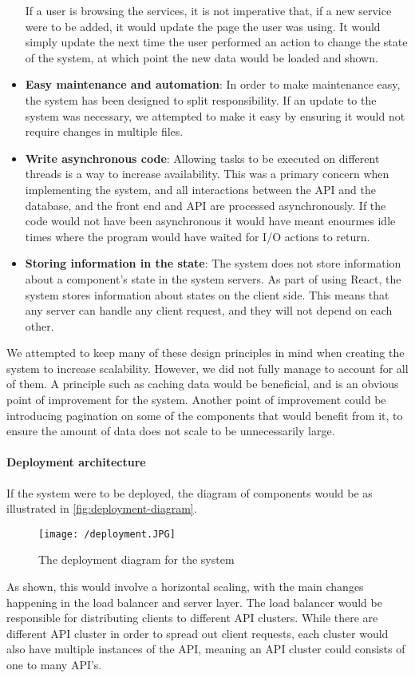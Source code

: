 \begin{itemize}
    If a user is browsing the services, it is not imperative that, if a new service were to be added, it would update the page the user was using.
    It would simply update the next time the user performed an action to change the state of the system, at which point the new data would be loaded and shown.
    \item \textbf{Easy maintenance and automation}: In order to make maintenance easy, the system has been designed to split responsibility.
    If an update to the system was necessary, we attempted to make it easy by ensuring it would not require changes in multiple files.
    \item \textbf{Write asynchronous code}: Allowing tasks to be executed on different threads is a way to increase availability. 
    This was a primary concern when implementing the system, and all interactions between the API and the database, and the front end and API are processed asynchronously.
    If the code would not have been asynchronous it would have meant enourmes idle times where the program would have waited for I/O actions to return.
    \item \textbf{Storing information in the state}: The system does not store information about a component's state in the system servers.
    As part of using React, the system stores information about states on the client side.
    This means that any server can handle any client request, and they will not depend on each other.
\end{itemize}
We attempted to keep many of these design principles in mind when creating the system to increase scalability.
However, we did not fully manage to account for all of them.
A principle such as caching data would be beneficial, and is an obvious point of improvement for the system.
Another point of improvement could be introducing pagination on some of the components that would benefit from it, to ensure the amount of data does not scale to be unnecessarily large.

\paragraph{Deployment architecture}
If the system were to be deployed, the diagram of components would be as illustrated in \autoref{fig:deployment-diagram}.
\begin{figure}[H]
    \texttt{[image: /deployment.JPG]}
     \caption{The deployment diagram for the system}
     \label{fig:deployment-diagram}
 \end{figure}
 \noindent
As shown, this would involve a horizontal scaling, with the main changes happening in the load balancer and server layer.
The load balancer would be responsible for distributing clients to different API clusters.
While there are different API cluster in order to spread out client requests, each cluster would also have multiple instances of the API, meaning an API cluster could consists of one to many API's.

